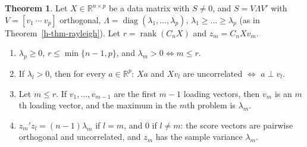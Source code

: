 \documentclass[12pt]{article}
\newcommand{\R}{\mathbb R}
\DeclareMathOperator{\diag}{diag}
\DeclareMathOperator{\rank}{rank}
\theoremstyle{definition}
\newtheorem{theorem}{Theorem}
\begin{document}
\begin{theorem}\label{h-thm-pca}
Let \(X\in\R^{n\times p}\) be a data matrix with \(S\ne0\), and \(S=V\Lambda V'\) with \(V=[v_1\ \cdots\ v_p]\)
orthogonal, \(\Lambda=\diag(\lambda_1,\dots,\lambda_p)\), \(\lambda_1\geqslant\dots\geqslant\lambda_p\) (as in
Theorem~\ref{h-thm-rayleigh}). Let \(r=\rank(C_nX)\) and \(z_m=C_nXv_m\).
\begin{enumerate}
\item \(\lambda_p\geqslant0\), \(r\leqslant\min\{n-1,p\}\), and \(\lambda_m>0\iff m\leqslant r\).
\item If \(\lambda_l>0\), then for every \(a\in\R^p\): \(Xa\) and \(Xv_l\) are uncorrelated \(\iff\) \(a\perp v_l\).
\item Let \(m\leqslant r\). If \(v_1,\dots,v_{m-1}\) are the first \(m-1\) loading vectors, then \(v_m\) is an \(m\)th
loading vector, and the maximum in the \(m\)th problem is \(\lambda_m\).
\item \(z_m'z_l=(n-1)\lambda_m\) if \(l=m\), and \(0\) if \(l\ne m\): the score vectors are pairwise orthogonal and
uncorrelated, and \(z_m\) has the sample variance \(\lambda_m\).
\end{enumerate}
\end{theorem}
\end{document}
